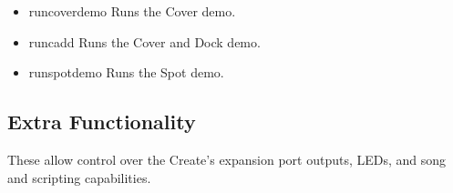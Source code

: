 \documentclass {article}
\begin{document}
\begin {itemize}
  \item {} {runcoverdemo}
        Runs the Cover demo. \\
        \retnorm

  \item {} {runcadd}
        Runs the Cover and Dock demo. \\
        \retnorm

  \item {} {runspotdemo}
        Runs the Spot demo. \\
        \retnorm
\end {itemize}

\subsection {Extra Functionality}
These allow control over the Create's expansion port outputs, LEDs, and song and scripting
capabilities.
\end{document}

